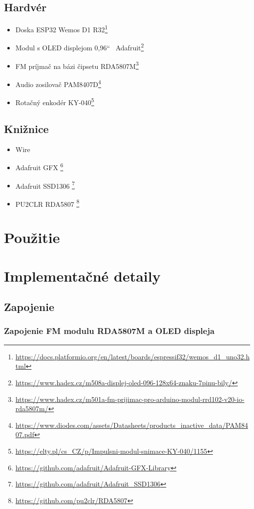 \documentclass[11pt, a4paper]{article}
\begin{document}
\subsection{Hardvér}
\begin{itemize}
    \item Doska ESP32 Wemos D1 R32\footnote{\url{https://docs.platformio.org/en/latest/boards/espressif32/wemos_d1_uno32.html}}
    \item Modul s OLED displejom 0,96`` \-\ Adafruit\footnote{\url{https://www.hadex.cz/m508a-displej-oled-096-128x64-znaku-7pinu-bily/}}
    \item FM príjmač na bázi čipsetu RDA5807M\footnote{\url{https://www.hadex.cz/m501a-fm-prijimac-pro-arduino-modul-rrd102-v20-io-rda5807m/}}
    \item Audio zosilovač PAM8407D\footnote{\url{https://www.diodes.com/assets/Datasheets/products_inactive_data/PAM8407.pdf}}
    \item Rotačný enkodér KY-040\footnote{\url{https://elty.pl/cs_CZ/p/Impulsni-modul-snimace-KY-040/1155}}
\end{itemize}
\subsection{Knižnice}
\begin{itemize}
    \item Wire 
    \item Adafruit GFX \footnote{\url{https://github.com/adafruit/Adafruit-GFX-Library}}
    \item Adafruit SSD1306 \footnote{\url{https://github.com/adafruit/Adafruit_SSD1306}}
    \item PU2CLR RDA5807 \footnote{\url{https://github.com/pu2clr/RDA5807}} 
\end{itemize}

\section{Použitie}

\section{Implementačné detaily}
\subsection{Zapojenie}
\subsubsection{Zapojenie FM modulu RDA5807M a OLED displeja}
\end{document}
